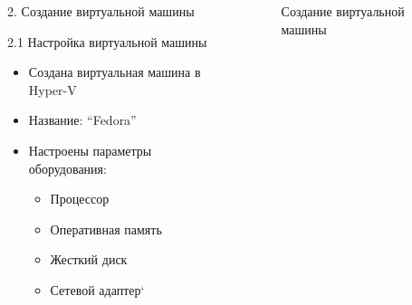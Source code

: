 \documentclass[
  ignorenonframetext,
  aspectratio=169,
  russian,
]{beamer}
\providecommand{\tightlist}{%
  \setlength{\itemsep}{0pt}\setlength{\parskip}{0pt}}
\begin{document}
\begin{columns}[c]
\begin{column}{0.7\linewidth}
\begin{frame}{2. Создание виртуальной машины}
\label{ux441ux43eux437ux434ux430ux43dux438ux435-ux432ux438ux440ux442ux443ux430ux43bux44cux43dux43eux439-ux43cux430ux448ux438ux43dux44b}
\begin{block}{2.1 Настройка виртуальной машины}
\label{ux43dux430ux441ux442ux440ux43eux439ux43aux430-ux432ux438ux440ux442ux443ux430ux43bux44cux43dux43eux439-ux43cux430ux448ux438ux43dux44b}
\begin{itemize}[<+->]
\tightlist
\item
  Создана виртуальная машина в Hyper-V
\item
  Название: \enquote{Fedora}
\item
  Настроены параметры оборудования:

  \begin{itemize}[<+->]
  \tightlist
  \item
    Процессор
  \item
    Оперативная память
  \item
    Жесткий диск
  \item
    Сетевой адаптер`
  \end{itemize}
\end{itemize}
\end{block}
\end{frame}
\end{column}

\begin{column}{0.3\linewidth}
\begin{figure}


\caption{\label{fig-vm}Создание виртуальной машины}

\end{figure}%
\end{column}
\end{columns}
\end{document}
